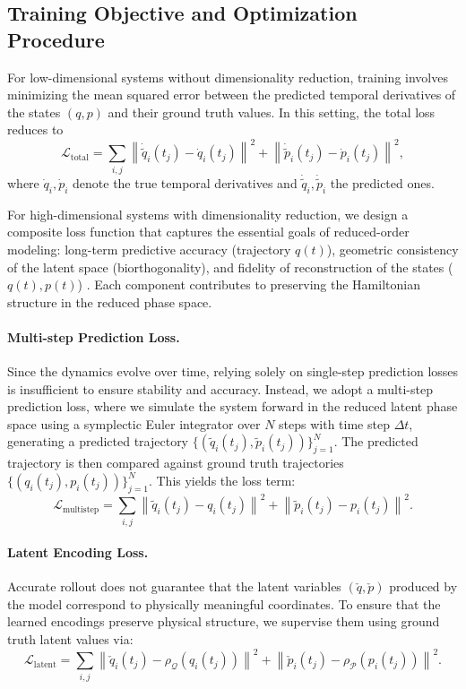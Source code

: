 \documentclass{article}
\theoremstyle{plain}
\theoremstyle{definition}
\theoremstyle{remark}
\begin{document}
\subsection{Training Objective and Optimization Procedure}
For low-dimensional systems without dimensionality reduction, training involves minimizing the mean squared error between the predicted temporal derivatives of the states \((q, p)\) and their ground truth values. In this setting, the total loss reduces to
\[
\mathcal{L}_{\text{total}} = \sum_{i,j} \left\| \dot{\tilde{q}}_i(t_j) - \dot{q}_i(t_j) \right\|^2 + \left\| \dot{\tilde{p}}_i(t_j) - \dot{p}_i(t_j) \right\|^2,
\]
where \(\dot{q}_i, \dot{p}_i\) denote the true temporal derivatives and \(\dot{\tilde{q}}_i, \dot{\tilde{p}}_i\) the predicted ones. 

For high-dimensional systems with dimensionality reduction, we design a composite loss function that captures the essential goals of reduced-order modeling: long-term predictive accuracy (trajectory $q(t)$), geometric consistency of the latent space (biorthogonality), and fidelity of reconstruction of the states ($q(t), p(t)$) . Each component contributes to preserving the Hamiltonian structure in the reduced phase space.

\paragraph{Multi-step Prediction Loss.}
Since the dynamics evolve over time, relying solely on single-step prediction losses is insufficient to ensure stability and accuracy. Instead, we adopt a multi-step prediction loss, where we simulate the system forward in the reduced latent phase space using a symplectic Euler integrator over $N$ steps with time step $\Delta t$, generating a predicted trajectory $\{(\tilde{q}_i(t_j), \tilde{p}_i(t_j))\}_{j=1}^N$. The predicted trajectory is then compared against ground truth trajectories $\{(q_i(t_j), p_i(t_j))\}_{j=1}^N$. This yields the loss term:
\[
\mathcal{L}_{\text{multistep}} = \sum_{i,j} \left\| \tilde{q}_i(t_j) - q_i(t_j) \right\|^2 + \left\| \tilde{p}_i(t_j) - p_i(t_j) \right\|^2.
\]

\paragraph{Latent Encoding Loss.}
Accurate rollout does not guarantee that the latent variables $(\check{q}, \check{p})$ produced by the model correspond to physically meaningful coordinates. To ensure that the learned encodings preserve physical structure, we supervise them using ground truth latent values via:
\[
\mathcal{L}_{\text{latent}} = \sum_{i,j} \left\| \check{q}_i(t_j) - \rho_{\mathcal{Q}}(q_i(t_j)) \right\|^2 + \left\| \check{p}_i(t_j) - \rho_{\mathcal{P}}(p_i(t_j)) \right\|^2.
\]
\end{document}

